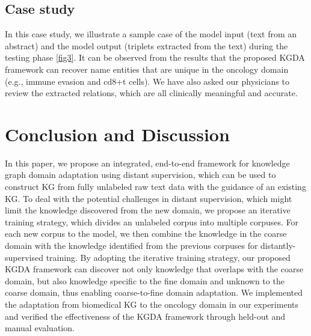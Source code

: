 \documentclass[sigconf]{acmart}
\begin{document}
\subsection{Case study}

In this case study, we illustrate a sample case of the model input (text from an abstract) and the model output (triplets extracted from the text) during the testing phase \ref{fig3}. It can be observed from the results that the proposed KGDA framework can recover name entities that are unique in the oncology domain (e.g., immune evasion and cd8+t cells). We have also asked our physicians to review the extracted relations, which are all clinically meaningful and accurate.

\section{Conclusion and Discussion}
In this paper, we propose an integrated, end-to-end framework for knowledge graph domain adaptation using distant supervision, which can be used to construct KG from fully unlabeled raw text data with the guidance of an existing KG. To deal with the potential challenges in distant supervision, which might limit the knowledge discovered from the new domain, we propose an iterative training strategy, which divides an unlabeled corpus into multiple corpuses. For each new corpus to the model, we then combine the knowledge in the coarse domain with the knowledge identified from the previous corpuses for distantly-supervised training. By adopting the iterative training strategy, our proposed KGDA framework can discover not only knowledge that overlaps with the coarse domain, but also knowledge specific to the fine domain and unknown to the coarse domain, thus enabling coarse-to-fine domain adaptation. We implemented the adaptation from biomedical KG to the oncology domain in our experiments and verified the effectiveness of the KGDA framework through held-out and manual evaluation.
\end{document}
